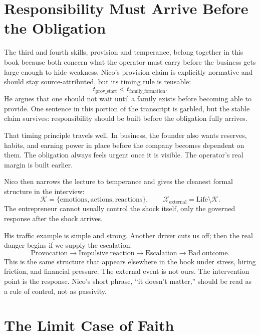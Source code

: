 \documentclass[11pt,oneside]{book}
\begin{document}
\section{Responsibility Must Arrive Before the Obligation}

The third and fourth skills, provision and temperance, belong together in this book because both concern what the operator must carry before the business gets large enough to hide weakness. Nico's provision claim is explicitly normative and should stay source-attributed, but its timing rule is reusable:
\begin{equation}
t_{\mathrm{prov\_start}}<t_{\mathrm{family\_formation}}.
\end{equation}
He argues that one should not wait until a family exists before becoming able to provide. One sentence in this portion of the transcript is garbled, but the stable claim survives: responsibility should be built before the obligation fully arrives.

That timing principle travels well. In business, the founder also wants reserves, habits, and earning power in place before the company becomes dependent on them. The obligation always feels urgent once it is visible. The operator's real margin is built earlier.

Nico then narrows the lecture to temperance and gives the cleanest formal structure in the interview:
\begin{equation}
\mathcal{K}=\{\mathrm{emotions},\mathrm{actions},\mathrm{reactions}\},
\qquad
\mathcal{X}_{\mathrm{external}}=\mathrm{Life}\setminus \mathcal{K}.
\end{equation}
The entrepreneur cannot usually control the shock itself, only the governed response after the shock arrives.

His traffic example is simple and strong. Another driver cuts us off; then the real danger begins if we supply the escalation:
\begin{equation}
\mathrm{Provocation}
\to
\mathrm{Impulsive\ reaction}
\to
\mathrm{Escalation}
\to
\mathrm{Bad\ outcome}.
\end{equation}
This is the same structure that appears elsewhere in the book under stress, hiring friction, and financial pressure. The external event is not ours. The intervention point is the response. Nico's short phrase, ``it doesn't matter,'' should be read as a rule of control, not as passivity.

\section{The Limit Case of Faith}
\end{document}
